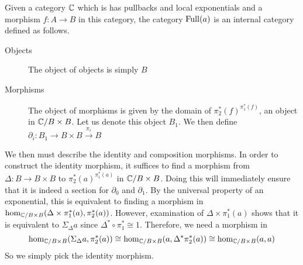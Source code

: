 \begin{example}\label{ex:internal:full}
  Given a category $\mathbb{C}$ which is has pullbacks and local
  exponentials and a morphism $f : A \to B$ in this category, the
  category $\operatorname{Full}(a)$ is an internal category defined as follows.
  \begin{description}
  \item[Objects] The object of objects is simply $B$
  \item[Morphisms] The object of morphisms is given by the domain of
    $\pi_2^*(f)^{\pi_1^*(f)}$, an object in $\mathbb{C}/B \times B$. Let us
    denote this object $B_1$. We then define
    $\partial_i : B_1 \to B \times B \overset{\pi_i}{\to} B$
  \end{description}
  We then must describe the identity and composition morphisms. In
  order to construct the identity morphism, it suffices to find a
  morphism from $\Delta : B \to B \times B$ to
  $\pi_2^*(a)^{\pi_1^*(a)}$ in $\mathbb{C}/B \times B$. Doing this will
  immediately ensure that it is indeed a section for $\partial_0$ and
  $\partial_1$. By the universal property of an exponential, this is
  equivalent to finding a morphism in
  $\hom_{\mathbb{C}/B \times B}(\Delta \times \pi_1^*(a), \pi_2^*(a))$.
  However, examination of $\Delta \times \pi_1^*(a)$ shows that it is
  equivalent to $\Sigma_\Delta a$ since
  $\Delta^* \circ \pi_1^* \cong 1$. Therefore, we need a morphism in
  \[
    \hom_{\mathbb{C}/B \times B}(\Sigma_\Delta a, \pi_2^*(a)) \cong
    \hom_{\mathbb{C}/B \times B}(a, \Delta^* \pi_2^*(a)) \cong
    \hom_{\mathbb{C}/B \times B}(a, a)
  \]
  So we simply pick the identity morphism.


\end{example}
